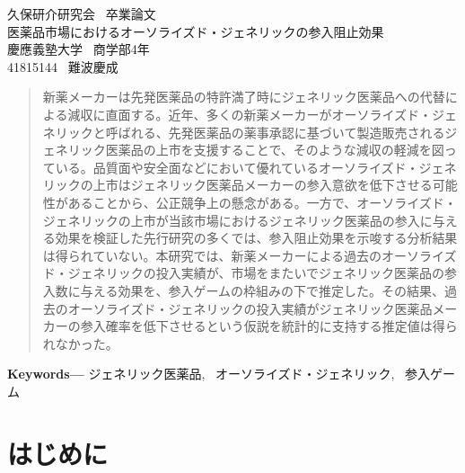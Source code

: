 \documentclass[a4j,10.5pt]{jarticle}
\providecommand{\keywords}[1]{\textbf{\textbf{Keywords---}} #1}
\begin{document}
\begin{center}
\vspace*{1.0cm}
{\large 久保研介研究会 \ 卒業論文 \\
\vspace*{3.5 mm}
\Large 医薬品市場におけるオーソライズド・ジェネリックの参入阻止効果
}\\
\vspace*{0.85cm}
{慶應義塾大学 \ 商学部4年 \\
\vspace*{2.5mm}
\large 41815144 \  難波慶成}
\vspace*{0.8cm}
\begin{abstract}
新薬メーカーは先発医薬品の特許満了時にジェネリック医薬品への代替による減収に直面する。近年、多くの新薬メーカーがオーソライズド・ジェネリックと呼ばれる、先発医薬品の薬事承認に基づいて製造販売されるジェネリック医薬品の上市を支援することで、そのような減収の軽減を図っている。品質面や安全面などにおいて優れているオーソライズド・ジェネリックの上市はジェネリック医薬品メーカーの参入意欲を低下させる可能性があることから、公正競争上の懸念がある。一方で、オーソライズド・ジェネリックの上市が当該市場におけるジェネリック医薬品の参入に与える効果を検証した先行研究の多くでは、参入阻止効果を示唆する分析結果は得られていない。本研究では、新薬メーカーによる過去のオーソライズド・ジェネリックの投入実績が、市場をまたいでジェネリック医薬品の参入数に与える効果を、参入ゲームの枠組みの下で推定した。その結果、過去のオーソライズド・ジェネリックの投入実績がジェネリック医薬品メーカーの参入確率を低下させるという仮説を統計的に支持する推定値は得られなかった。


\end{abstract}
\vspace{0.5cm}
\keywords{ジェネリック医薬品, \ オーソライズド・ジェネリック, \ 参入ゲーム}

\end{center}

\section{はじめに}
\end{document}
